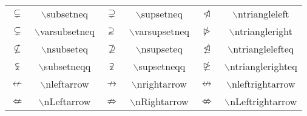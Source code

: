 \documentclass[UTF8]{ctexart}
\begin{document}
\begin{table}[H]
\begin{center}
\begin{tabular}{cccccc}
			$\subsetneq$  &  $\backslash$subsetneq  &  $\supsetneq$  & $\backslash$supsetneq  &  $\ntriangleleft$  & $\backslash$ntriangleleft  \\


			$\varsubsetneq$  &  $\backslash$varsubsetneq  &  $\varsupsetneq$  & $\backslash$varsupsetneq  &  $\ntriangleright$  & $\backslash$ntriangleright  \\

			$\nsubseteq$  &  $\backslash$nsubseteq  &  $\nsupseteq$  & $\backslash$nsupseteq  &  $\ntrianglelefteq$  & $\backslash$ntrianglelefteq  \\

			$\subsetneqq$  &  $\backslash$subsetneqq  &  $\supsetneqq$  & $\backslash$supsetneqq  &  $\ntrianglerighteq$  & $\backslash$ntrianglerighteq  \\

			$\nleftarrow$  &  $\backslash$nleftarrow  &  $\nrightarrow$  & $\backslash$nrightarrow  &  $\nleftrightarrow$  & $\backslash$nleftrightarrow  \\

			$\nLeftarrow$  &  $\backslash$nLeftarrow  &  $\nRightarrow$  & $\backslash$nRightarrow  &  $\nLeftrightarrow$  & $\backslash$nLeftrightarrow  \\

		\end{tabular}
	\end{center}
\end{table}
\end{document}
